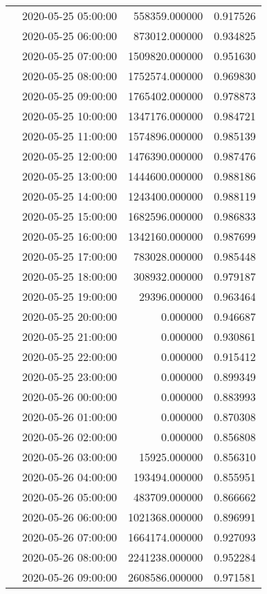 \begin{tabular}{llrr}
 & 2020-05-25 05:00:00 & 558359.000000 & 0.917526 \\
 & 2020-05-25 06:00:00 & 873012.000000 & 0.934825 \\
 & 2020-05-25 07:00:00 & 1509820.000000 & 0.951630 \\
 & 2020-05-25 08:00:00 & 1752574.000000 & 0.969830 \\
 & 2020-05-25 09:00:00 & 1765402.000000 & 0.978873 \\
 & 2020-05-25 10:00:00 & 1347176.000000 & 0.984721 \\
 & 2020-05-25 11:00:00 & 1574896.000000 & 0.985139 \\
 & 2020-05-25 12:00:00 & 1476390.000000 & 0.987476 \\
 & 2020-05-25 13:00:00 & 1444600.000000 & 0.988186 \\
 & 2020-05-25 14:00:00 & 1243400.000000 & 0.988119 \\
 & 2020-05-25 15:00:00 & 1682596.000000 & 0.986833 \\
 & 2020-05-25 16:00:00 & 1342160.000000 & 0.987699 \\
 & 2020-05-25 17:00:00 & 783028.000000 & 0.985448 \\
 & 2020-05-25 18:00:00 & 308932.000000 & 0.979187 \\
 & 2020-05-25 19:00:00 & 29396.000000 & 0.963464 \\
 & 2020-05-25 20:00:00 & 0.000000 & 0.946687 \\
 & 2020-05-25 21:00:00 & 0.000000 & 0.930861 \\
 & 2020-05-25 22:00:00 & 0.000000 & 0.915412 \\
 & 2020-05-25 23:00:00 & 0.000000 & 0.899349 \\
 & 2020-05-26 00:00:00 & 0.000000 & 0.883993 \\
 & 2020-05-26 01:00:00 & 0.000000 & 0.870308 \\
 & 2020-05-26 02:00:00 & 0.000000 & 0.856808 \\
 & 2020-05-26 03:00:00 & 15925.000000 & 0.856310 \\
 & 2020-05-26 04:00:00 & 193494.000000 & 0.855951 \\
 & 2020-05-26 05:00:00 & 483709.000000 & 0.866662 \\
 & 2020-05-26 06:00:00 & 1021368.000000 & 0.896991 \\
 & 2020-05-26 07:00:00 & 1664174.000000 & 0.927093 \\
 & 2020-05-26 08:00:00 & 2241238.000000 & 0.952284 \\
 & 2020-05-26 09:00:00 & 2608586.000000 & 0.971581 \\

\end{tabular}
